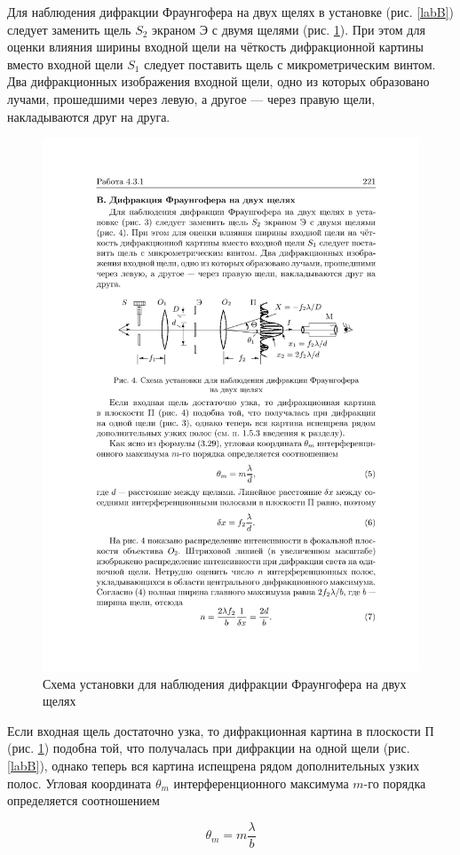\documentclass[a4paper,12pt]{article} %
\begin{document}
Для наблюдения дифракции Фраунгофера на двух щелях в установке (рис. \ref{labB}) следует заменить щель $ S_2 $ экраном Э с двумя щелями
(рис. \ref{labC}). При этом для оценки влияния ширины входной щели на чёткость дифракционной картины вместо входной щели $ S_1 $ следует поставить щель с микрометрическим винтом. Два дифракционных изображения входной щели, одно из которых образовано лучами, прошедшими через левую, а другое --- через правую щели, накладываются друг на друга.

\begin{figure}[h!]
	\centering
	\includegraphics[width=0.8\linewidth]{c.pdf}
	\caption{Схема установки для наблюдения дифракции Фраунгофера на двух щелях}
	\label{labC}
\end{figure}

Если входная щель достаточно узка, то дифракционная картина
в плоскости П (рис. \ref{labC}) подобна той, что получалась при дифракции
на одной щели (рис. \ref{labB}), однако теперь вся картина испещрена рядом
дополнительных узких полос.
Угловая координата $ \theta_m $ интерференционного максимума $ m $-го порядка определяется соотношением

\begin{equation}\label{}
\theta_m = m \dfrac{\lambda}{b}
\end{equation}
\end{document}
